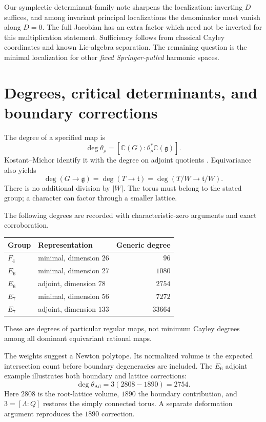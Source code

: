 \documentclass[11pt]{article}
\newcommand{\C}{\mathbb C}
\newcommand{\g}{\mathfrak g}
\newcommand{\h}{\mathfrak t}
\begin{document}
Our symplectic determinant-family note sharpens the localization: inverting $D$ suffices, and among invariant principal localizations the denominator must vanish along $D=0$. The full Jacobian has an extra factor which need not be inverted for this multiplication statement. Sufficiency follows from classical Cayley coordinates and known Lie-algebra separation. The remaining question is the minimal localization for other \emph{fixed Springer-pulled} harmonic spaces.

\section{Degrees, critical determinants, and boundary corrections}

The degree of a specified map is
\begin{equation}\label{eq:degree}
 \deg\theta_\rho=[\C(G):\theta_\rho^*\C(\g)].
\end{equation}
Kostant--Michor identify it with the degree on adjoint quotients \cite[Corollary 3.3]{KM}. Equivariance also yields
\[
 \deg(G\to\g)=\deg(T\to\h)=\deg(T/W\to\h/W).
\]
There is no additional division by $|W|$. The torus must belong to the stated group; a character can factor through a smaller lattice.

The following degrees are recorded with characteristic-zero arguments and exact corroboration.
\begin{center}
\begin{tabular}{llr}
\toprule Group & Representation & Generic degree\\
\midrule
$F_4$ & minimal, dimension $26$ & $96$\\
$E_6$ & minimal, dimension $27$ & $1080$\\
$E_6$ & adjoint, dimension $78$ & $2754$\\
$E_7$ & minimal, dimension $56$ & $7272$\\
$E_7$ & adjoint, dimension $133$ & $33664$\\
\bottomrule
\end{tabular}
\end{center}
These are degrees of particular regular maps, not minimum Cayley degrees among all dominant equivariant rational maps.

The weights suggest a Newton polytope. Its normalized volume is the expected intersection count before boundary degeneracies are included. The $E_6$ adjoint example illustrates both boundary and lattice corrections:
\[
 \deg\theta_{\mathrm{Ad}}=3(2808-1890)=2754.
\]
Here $2808$ is the root-lattice volume, $1890$ the boundary contribution, and $3=[\Lambda:Q]$ restores the simply connected torus. A separate deformation argument reproduces the $1890$ correction.
\end{document}
